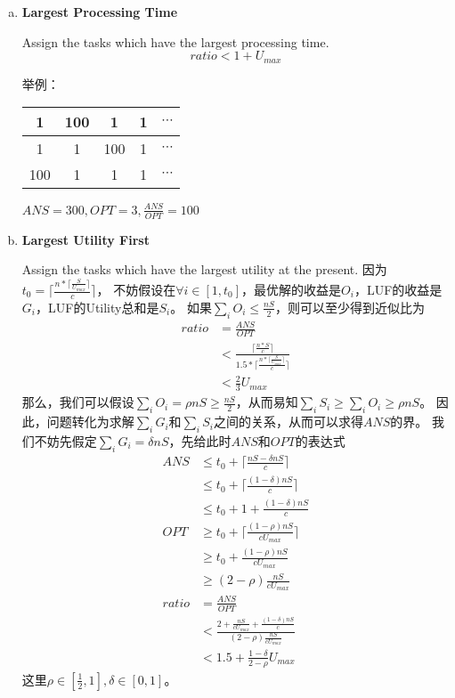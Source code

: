 \documentclass[UTF8]{ctexart}
\newcommand{\Emph}{\textbf}
\begin{document}
\begin{enumerate}[I]
\begin{enumerate}[(a)]
		\item \Emph{Largest Processing Time}
		
		Assign the tasks which have the largest processing time.
		\begin{equation*}
			ratio < 1 + U_{max}
		\end{equation*}
		
		举例：
		\begin{center}
		\begin{tabular}{|c|c|c|c|c|}
			\hline
			1   &100 &1   &1 &$\cdots$ \\
			\hline
			1   &1   &100 &1 &$\cdots$ \\
			\hline
			100 &1   &1   &1 &$\cdots$ \\
			\hline
		\end{tabular}
		\end{center}
		
		$ANS = 300, OPT = 3, \frac{ANS}{OPT} = 100$
		
		\newpage
		\item \Emph{Largest Utility First}
		
		Assign the tasks which have the largest utility at the present.
		因为$t_0 = \lceil \frac{n * \lceil \frac{S}{U_{max}} \rceil}{c} \rceil$，
		不妨假设在$\forall i \in [1,t_0]$，最优解的收益是$O_i$，LUF的收益是$G_i$，LUF的Utility总和是$S_i$。
		如果$\sum_{i} O_i \le \frac{nS}{2}$，则可以至少得到近似比为
		\begin{align*}
			ratio &= \frac{ANS}{OPT} \\
				  &< \frac{\lceil \frac{n*S}{c} \rceil}{1.5 * \lceil \frac{n * \lceil \frac{S}{U_{max}} \rceil}{c} \rceil}	\\
				  &< \frac{2}{3} U_{max}
		\end{align*}
		那么，我们可以假设$\sum_{i} O_i = \rho nS \ge \frac{nS}{2}$，从而易知$\sum_{i} S_i \ge \sum_{i} O_i \ge \rho nS$。
		因此，问题转化为求解$\sum_{i} G_i$和$\sum_{i} S_i$之间的关系，从而可以求得$ANS$的界。
		我们不妨先假定$\sum_{i} G_i = \delta nS$，先给此时$ANS$和$OPT$的表达式
		\begin{align*}
			ANS &\le t_0 + \lceil \frac{nS - \delta nS}{c} \rceil \\
				&\le t_0 + \lceil \frac{(1-\delta)nS}{c} \rceil \\
				&\le t_0 + 1 + \frac{(1-\delta)nS}{c} \\
			OPT &\ge t_0 + \lceil \frac{(1-\rho)nS}{cU_{max}} \rceil \\
				&\ge t_0 + \frac{(1-\rho)nS}{cU_{max}} \\
				&\ge (2-\rho) \frac{nS}{cU_{max}} \\
			ratio &= \frac{ANS}{OPT} \\
				  &< \frac{2 + \frac{nS}{cU_{max}} + \frac{(1-\delta)nS}{c}}{(2-\rho) \frac{nS}{cU_{max}}} \\
				  &< 1.5 + \frac{1-\delta}{2-\rho} U_{max}
		\end{align*}
		这里$\rho \in [\frac{1}{2}, 1], \delta \in [0,1]$。
		

\end{enumerate}
\end{enumerate}
\end{document}
